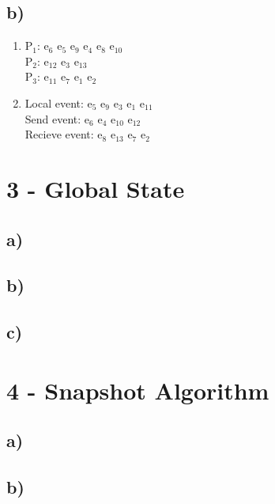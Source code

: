 \documentclass{scrartcl}
\begin{document}
\subsection*{b)}
\begin{enumerate}[label=(\roman*)]
	\item 
	P$_1$: e$_6$ e$_5$ e$_9$ e$_4$ e$_8$ e$_{10}$\\
	P$_2$: e$_{12}$ e$_3$ e$_{13}$\\
	P$_3$: e$_{11}$ e$_7$ e$_1$ e$_2$\\
	\item 
	Local event: e$_5$ e$_9$ e$_3$ e$_1$ e$_{11}$\\
	Send event: e$_6$ e$_4$ e$_{10}$ e$_{12}$\\
	Recieve event:  e$_8$ e$_{13}$ e$_7$ e$_2$\\
\end{enumerate}
\section*{3 - Global State}
\subsection*{a)}

\subsection*{b)}

\subsection*{c)}

\section*{4 - Snapshot Algorithm}
\subsection*{a)}

\subsection*{b)}
\end{document}
